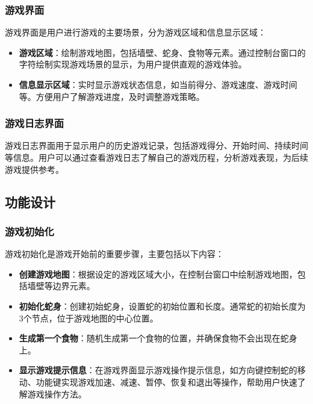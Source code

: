 \documentclass{article}
\begin{document}
\subsubsection{游戏界面}
游戏界面是用户进行游戏的主要场景，分为游戏区域和信息显示区域：
\begin{itemize}
    \item \textbf{游戏区域}：绘制游戏地图，包括墙壁、蛇身、食物等元素。通过控制台窗口的字符绘制实现游戏场景的显示，为用户提供直观的游戏体验。
    \item \textbf{信息显示区域}：实时显示游戏状态信息，如当前得分、游戏速度、游戏时间等。方便用户了解游戏进度，及时调整游戏策略。
\end{itemize}

\subsubsection{游戏日志界面}
游戏日志界面用于显示用户的历史游戏记录，包括游戏得分、开始时间、持续时间等信息。用户可以通过查看游戏日志了解自己的游戏历程，分析游戏表现，为后续游戏提供参考。

\subsection{功能设计}

\subsubsection{游戏初始化}
游戏初始化是游戏开始前的重要步骤，主要包括以下内容：
\begin{itemize}
    \item \textbf{创建游戏地图}：根据设定的游戏区域大小，在控制台窗口中绘制游戏地图，包括墙壁等边界元素。
    \item \textbf{初始化蛇身}：创建初始蛇身，设置蛇的初始位置和长度。通常蛇的初始长度为3个节点，位于游戏地图的中心位置。
    \item \textbf{生成第一个食物}：随机生成第一个食物的位置，并确保食物不会出现在蛇身上。
    \item \textbf{显示游戏提示信息}：在游戏界面显示游戏操作提示信息，如方向键控制蛇的移动、功能键实现游戏加速、减速、暂停、恢复和退出等操作，帮助用户快速了解游戏操作方法。
\end{itemize}
\end{document}
